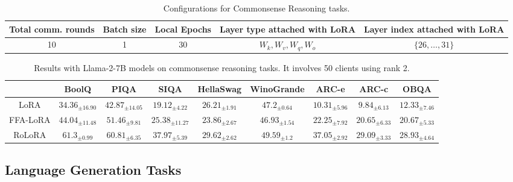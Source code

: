 \documentclass{article}
\theoremstyle{plain}
\theoremstyle{definition}
\theoremstyle{remark}
\begin{document}
\begin{table}[h]
{\scriptsize
    \centering
    \begin{tabular}{ccccc}
    \toprule
        Total comm. rounds & Batch size &  Local Epochs & Layer type attached with LoRA &Layer index attached with LoRA \\
        \midrule
        10 & 1 & 30 & $W_k,W_v, W_q, W_o$ & $\{26,\ldots,31\}$\\
        \bottomrule
    \end{tabular}
    \vspace{4pt}
    \caption{Configurations for Commonsense Reasoning tasks.}
    \label{tab:commonsense-task}}
\end{table}
\begin{table}[h]
{\scriptsize
    \centering
    \begin{tabular}{ccccccccc}
    \toprule
         & BoolQ & PIQA & SIQA & HellaSwag & WinoGrande & ARC-e & ARC-c & OBQA\\
         \midrule
        LoRA & $\text{34.36}_{\pm \text{16.90}}$ & $\text{42.87}_{\pm \text{14.05}}$ & $\text{19.12}_{\pm \text{4.22}}$ & $\text{26.21}_{\pm \text{1.91}}$ & $\text{47.2}_{\pm \text{0.64}}$ & $\text{10.31}_{\pm \text{5.96}}$ & $\text{9.84}_{\pm \text{6.13}}$  &$\text{12.33}_{\pm \text{7.46}}$ \\
        FFA-LoRA & $\text{44.04}_{\pm \text{11.48}}$ & $\text{51.46}_{\pm \text{9.81}}$ & $\text{25.38}_{\pm \text{11.27}}$ & $\text{23.86}_{\pm \text{2.67}}$ & $\text{46.93}_{\pm \text{1.54}}$ & $\text{22.25}_{\pm \text{7.92}}$ & $\text{20.65}_{\pm \text{6.33}}$ & $\text{20.67}_{\pm \text{5.33}}$\\
         \rowcolor{ours}RoLoRA  &  $\text{61.3}_{\pm \text{0.99}}$ & $\text{60.81}_{\pm \text{6.35}}$ & $\text{37.97}_{\pm \text{5.39}}$ & $\text{29.62}_{\pm \text{2.62}}$ & $\text{49.59}_{\pm \text{1.2}}$ & $\text{37.05}_{\pm \text{2.92}}$ & $\text{29.09}_{\pm \text{3.33}}$ & $\text{28.93}_{\pm \text{4.64}}$\\
        \bottomrule
    \end{tabular}
    \vspace{4pt}
    \caption{Results with Llama-2-7B models on commonsense reasoning tasks. It involves 50 clients using rank 2.}
    \label{tab:reasoning-rank2-appendix}}
\end{table}
 \subsection{Language Generation Tasks} \label{sec:setup-LGT}
 \vspace{-0.3cm}
\end{document}

